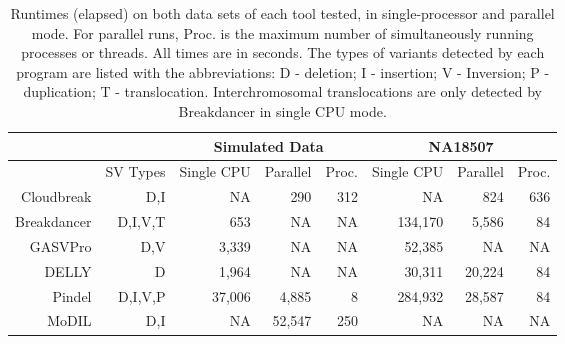 \documentclass[11pt]{article}
\begin{document}
\begin{table}[h]
\begin{center}
\begin{tabular}{r|r|rrr|rrr}
\multicolumn{2}{c}{}  & \multicolumn{3}{c}{Simulated Data} & \multicolumn{3}{c}{NA18507} \\
\hline
 & SV Types &  Single CPU & Parallel & Proc. &  Single CPU & Parallel & Proc.  \\ 
  \hline
  Cloudbreak & D,I &   NA    & 290 & 312    & NA         & 824 & 636 \\ 
  Breakdancer & D,I,V,T &  653   & NA       & NA          & 134,170 &  5,586 & 84 \\
  GASVPro & D,V   &  3,339  & NA       & NA         & 52,385  & NA & NA \\
  DELLY & D         &  1,964 & NA          & NA      & 30,311  & 20,224 & 84 \\
  Pindel & D,I,V,P         & 37,006 &  4,885     & 8          &  284,932  & 28,587 & 84 \\ 
  MoDIL & D,I        &  NA      & 52,547 & 250 & NA         & NA  & NA\\ 
   \hline
\end{tabular}
\end{center}
\caption{Runtimes (elapsed) on both data sets of each tool tested, in single-processor and parallel mode. For parallel runs, Proc. is the maximum number of simultaneously running processes or threads. All times are in seconds. The types of variants detected by each program are listed with the abbreviations: D - deletion; I - insertion; V - Inversion; P - duplication; T - translocation. Interchromosomal translocations are only detected by Breakdancer in single CPU mode. }
\label{runtimes}
\end{table}

\newpage 
\end{document}
